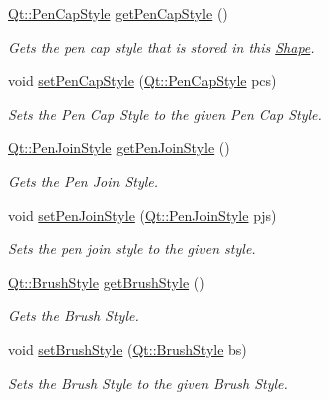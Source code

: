 \begin{DoxyCompactItemize}
\hyperlink{shape__input__file__specs_8txt_a622efdcfef6789d4367974d2fe79019e}{Qt\+::\+Pen\+Cap\+Style} \hyperlink{classEllipse_a31f27784ade1471b1c48e23d0c4dcfc3}{get\+Pen\+Cap\+Style} ()
\begin{DoxyCompactList}\small\item\em Gets the pen cap style that is stored in this \hyperlink{classShape}{Shape}. \end{DoxyCompactList}\item 
void \hyperlink{classEllipse_a7e97c7286539aee8a6b23af78a5f450c}{set\+Pen\+Cap\+Style} (\hyperlink{shape__input__file__specs_8txt_a622efdcfef6789d4367974d2fe79019e}{Qt\+::\+Pen\+Cap\+Style} pcs)
\begin{DoxyCompactList}\small\item\em Sets the Pen Cap Style to the given Pen Cap Style. \end{DoxyCompactList}\item 
\hyperlink{shape__input__file__specs_8txt_a007db2043c6063881de2043c05c9c4a9}{Qt\+::\+Pen\+Join\+Style} \hyperlink{classEllipse_a0f6832606831fd3399a84b0f3174249a}{get\+Pen\+Join\+Style} ()
\begin{DoxyCompactList}\small\item\em Gets the Pen Join Style. \end{DoxyCompactList}\item 
void \hyperlink{classEllipse_a3d6f6123f1cdfa3bb8c6e8964052d139}{set\+Pen\+Join\+Style} (\hyperlink{shape__input__file__specs_8txt_a007db2043c6063881de2043c05c9c4a9}{Qt\+::\+Pen\+Join\+Style} pjs)
\begin{DoxyCompactList}\small\item\em Sets the pen join style to the given style. \end{DoxyCompactList}\item 
\hyperlink{shape__input__file__specs_8txt_ad07f6fe6c28dcb0b3bdc324a72d0051f}{Qt\+::\+Brush\+Style} \hyperlink{classEllipse_ab3c8a9b4e1cb554f1ad8677a407ac398}{get\+Brush\+Style} ()
\begin{DoxyCompactList}\small\item\em Gets the Brush Style. \end{DoxyCompactList}\item 
void \hyperlink{classEllipse_ab7948b55080ea45bc7cbf14cb7d432b8}{set\+Brush\+Style} (\hyperlink{shape__input__file__specs_8txt_ad07f6fe6c28dcb0b3bdc324a72d0051f}{Qt\+::\+Brush\+Style} bs)
\begin{DoxyCompactList}\small\item\em Sets the Brush Style to the given Brush Style. \end{DoxyCompactList}\item 

\end{DoxyCompactItemize}
